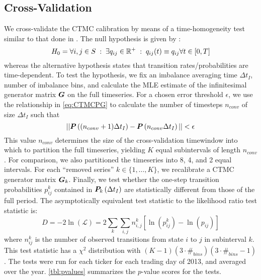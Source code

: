 \subsection{Cross-Validation}
We cross-validate the CTMC calibration by means of a time-homogeneity test similar to that done in \citet{Tan02}. The null hypothesis is given by \citep{Weiss10}:
\begin{equation}
H_0 = \forall i,j \in S \; : \; \exists q_{ij} \in \mathbb{R}^+ \; : \; q_{ij}(t) \equiv q_{ij} \forall t \in [0,T]
\end{equation}
whereas the alternative hypothesis states that transition rates/probabilities are time-dependent. To test the hypothesis, we fix an imbalance averaging time $\Delta t_I$, number of imbalance bins, and calculate the MLE estimate of the infinitesimal generator matrix $\boldsymbol{G}$ on the full timeseries. For a chosen error threshold $\epsilon$, we use the relationship in \eqref{eq:CTMCPG} to calculate the number of timesteps $n_{conv}$ of size $\Delta t_I$ such that
\begin{equation}\label{eq:crossvalidnconv}
|| \boldsymbol{P}\left((n_{conv}+1)\Delta t_I \right) - \boldsymbol{P} \left( n_{conv}\Delta t_I \right) || < \epsilon
\end{equation}
This value $n_{conv}$ determines the size of the cross-validation timewindow into which to partition the full timeseries, yielding $K$ equal subintervals of length $n_{conv}$. For comparison, we also partitioned the timeseries into 8, 4, and 2 equal intervals. For each ``removed series'' $k \in \{ 1,\dots,K \}$, we recalibrate a CTMC generator matrix $\boldsymbol{G}_{k}$. Finally, we test whether the one-step transition probabilities $p_{ij}^k$ contained in $\boldsymbol{P}_k \left(\Delta t_I \right)$ are statistically different from those of the full period. The asymptotically equivalent test statistic to the likelihood ratio test statistic is:
\begin{equation}
D = -2 \ln (\mathcal{L})  = 2 \sum_k \sum_{i,j} n_{i,j}^k \left[ \ln(p_{ij}^k)  - \ln(p_{ij})   \right]
\end{equation}
where $n_{ij}^k$ is the number of observed transitions from state $i$ to $j$ in subinterval $k$. This test statistic has a $\chi^2$ distribution with $(K-1)(3 \cdot \#_{bins})(3 \cdot \#_{bins} - 1)$. The tests were run for each ticker for each trading day of 2013, and averaged over the year. \autoref{tbl:pvalues} summarizes the $p$-value scores for the tests.
